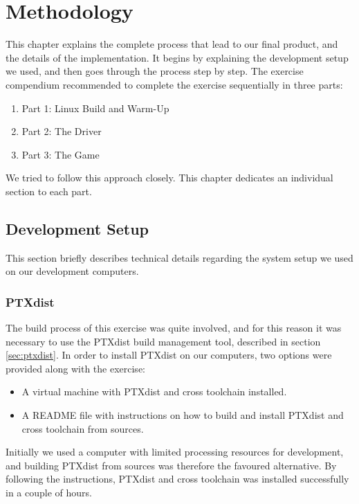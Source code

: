 \chapter{Methodology}
This chapter explains the complete process that lead to our final product, and the details of the implementation. It begins by explaining the development setup we used, and then goes through the process step by step. The exercise compendium recommended to complete the exercise sequentially in three parts:
\begin{enumerate}
  \item Part 1: Linux Build and Warm-Up
  \item Part 2: The Driver
  \item Part 3: The Game
\end{enumerate}
We tried to follow this approach closely. This chapter dedicates an individual section to each part.


\section{Development Setup}
This section briefly describes technical details regarding the system setup we used on our development computers.

\subsection{PTXdist}
The build process of this exercise was quite involved, and for this reason it was necessary to use the PTXdist build management tool, described in section \ref{sec:ptxdist}. In order to install PTXdist on our computers, two options were provided along with the exercise:
\begin{itemize}
  \item A virtual machine with PTXdist and cross toolchain installed.
  \item A README file with instructions on how to build and install PTXdist and cross toolchain from sources.
\end{itemize}
Initially we used a computer with limited processing resources for development, and building PTXdist from sources was therefore the favoured alternative. By following the instructions, PTXdist and cross toolchain was installed successfully in a couple of hours.

